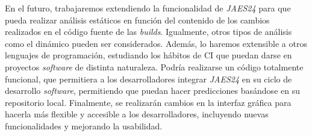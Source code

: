 En el futuro, trabajaremos extendiendo la funcionalidad de \textit{JAES24} para que pueda
realizar análisis estáticos en función del contenido de los cambios realizados en el código
fuente de las \textit{builds}. Igualmente, otros tipos de análisis como el dinámico
pueden ser considerados. Además, lo haremos extensible a otros lenguajes de programación, estudiando los hábitos
de CI que puedan darse en proyectos \textit{software} de distinta naturaleza. Podría
realizarse un código totalmente funcional, que permitiera a los desarrolladores integrar
\textit{JAES24} en su ciclo de desarrollo \textit{software}, permitiendo que puedan hacer
predicciones basándose en su repositorio local. Finalmente, se realizarán cambios en la
interfaz gráfica para hacerla más flexible y accesible a los desarrolladores, incluyendo nuevas
funcionalidades y mejorando la usabilidad.\\